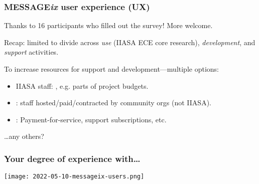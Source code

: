 \documentclass[12pt,aspectratio=169]{beamer}
\begin{document}
\begin{frame}
\frametitle{MESSAGE\emph{ix} user experience (UX)}

Thanks to 16 participants who filled out the survey! More welcome.

\bigskip
Recap: limited  to divide across \emph{use} (IIASA ECE core research), \emph{development}, and \emph{support} activities.

\bigskip
To increase resources for support and development—multiple options:
\begin{itemize}
  \item IIASA staff: , e.g. parts of project budgets.
  \item {}: staff hosted/paid/contracted by community orgs (not IIASA).
  \item {}: Payment-for-service, support subscriptions, etc.
\end{itemize}
\hspace{20mm}…any others?

\end{frame}

\begin{frame}[plain]
\frametitle{Your degree of experience with…}
\texttt{[image: 2022-05-10-messageix-users.png]}
\end{frame}
\end{document}
